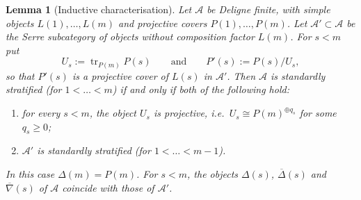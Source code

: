 \documentclass[11pt,reqno]{amsart}
\theoremstyle{plain}
\newtheorem{lemma}[theorem]{Lemma}
\theoremstyle{definition}
\theoremstyle{remark}
\DeclareMathOperator{\tr}{tr}
\newcommand{\nablabar}{\overline{\nabla}}
\newcommand{\Deltabar}{\overline{\Delta}}
\newcommand{\cA}{\mathcal{A}}
\begin{document}
\begin{lemma}[Inductive characterisation]\label{lem:strat-induction}
Let $\cA$ be Deligne finite, with simple objects $L(1),\dots,L(m)$ and projective covers $P(1),\dots,P(m)$. Let $\cA'\subset\cA$ be the Serre subcategory of objects without composition factor $L(m)$. For $s<m$ put
\[U_s:=\tr_{P(m)}P(s)\qquad\text{and}\qquad P'(s):=P(s)/U_s,\]
so that $P'(s)$ is a projective cover of $L(s)$ in $\cA'$. Then $\cA$ is standardly stratified (for $1<\dots<m$) if and only if both of the following hold:
\begin{enumerate}
\item[(a)] for every $s<m$, the object $U_s$ is projective, i.e.\ $U_s\cong P(m)^{\oplus q_s}$ for some $q_s\ge0$;
\item[(b)] $\cA'$ is standardly stratified (for $1<\dots<m-1$).
\end{enumerate}
In this case $\Delta(m)=P(m)$. For $s<m$, the objects $\Delta(s)$, $\Deltabar(s)$ and $\nablabar(s)$ of $\cA$ coincide with those of $\cA'$.
\end{lemma}
\end{document}
